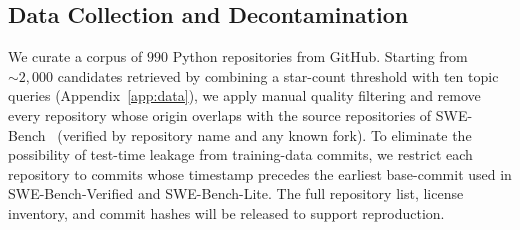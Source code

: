 \subsection{Data Collection and Decontamination}
\label{sec:method:data}

We curate a corpus of $990$ Python repositories from GitHub. Starting from
$\sim\!2{,}000$ candidates retrieved by combining a star-count threshold with
ten topic queries (Appendix~\ref{app:data}), we apply manual quality filtering
and remove every repository whose origin overlaps with the source repositories
of SWE-Bench~\citep{swebench} (verified by repository name and any known
fork). To eliminate the possibility of test-time leakage from training-data
commits, we restrict each repository to commits whose timestamp precedes the
earliest base-commit used in SWE-Bench-Verified and SWE-Bench-Lite. The full
repository list, license inventory, and commit hashes will be released to
support reproduction.

